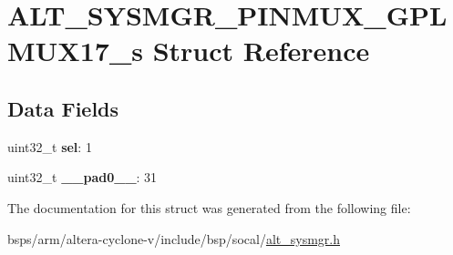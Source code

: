 \hypertarget{structALT__SYSMGR__PINMUX__GPLMUX17__s}{}\section{A\+L\+T\+\_\+\+S\+Y\+S\+M\+G\+R\+\_\+\+P\+I\+N\+M\+U\+X\+\_\+\+G\+P\+L\+M\+U\+X17\+\_\+s Struct Reference}
\label{structALT__SYSMGR__PINMUX__GPLMUX17__s}
\subsection*{Data Fields}
\begin{DoxyCompactItemize}
\item 
\mbox{\label{structALT__SYSMGR__PINMUX__GPLMUX17__s_a5d37fcee82986f785e2d44a739f1da02}} 
uint32\+\_\+t {\bfseries sel}\+: 1
\item 
\mbox{\label{structALT__SYSMGR__PINMUX__GPLMUX17__s_a57ca2667e19cde613e9c469da7836248}} 
uint32\+\_\+t {\bfseries \+\_\+\+\_\+pad0\+\_\+\+\_\+}\+: 31
\end{DoxyCompactItemize}


The documentation for this struct was generated from the following file\+:\begin{DoxyCompactItemize}
\item 
bsps/arm/altera-\/cyclone-\/v/include/bsp/socal/\mbox{\hyperlink{alt__sysmgr_8h}{alt\+\_\+sysmgr.\+h}}\end{DoxyCompactItemize}
